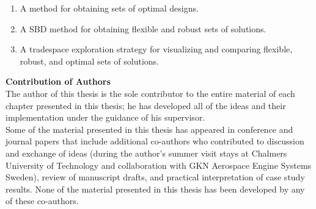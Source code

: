 \documentclass[12pt,Bold,letterpaper,TexShade,twoside]{mcgilletdclass}
\begin{document}
\begin{romanPagenumber}{2}
{\begin{enumerate}
\begin{enumerate}
		\item{A method for obtaining sets of optimal designs.}
		\item{A \acl{SBD} method for obtaining flexible and robust sets of solutions.}
		\item{A tradespace exploration strategy for visualizing and comparing flexible, robust, and optimal sets of solutions.}
	\end{enumerate}
\end{enumerate}
%
\textbf{Contribution of Authors}\\
%
The author of this thesis is the sole contributor to the entire material of each chapter presented in this thesis; he has developed all of the ideas and their implementation under the guidance of his supervisor.\\
%
Some of the material presented in this thesis has appeared in conference and journal papers that include additional co-authors who contributed to discussion and exchange of ideas (during the author's summer visit stays at Chalmers University of Technology and collaboration with GKN Aerospace Engine Systems Sweden), review of manuscript drafts, and practical interpretation of case study results. None of the material presented in this thesis has been developed by any of these co-authors.
}%
\Contribution%


\end{romanPagenumber}
\end{document}
